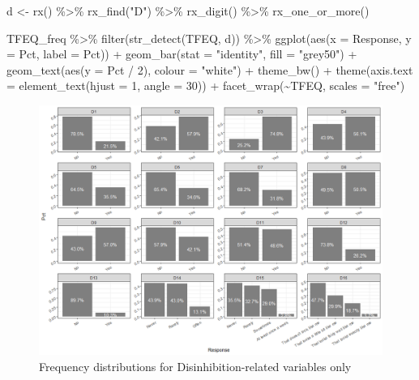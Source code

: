 \documentclass[
]{krantz}
\makeatletter
\newenvironment{Shaded}{\begin{snugshade}}{\end{snugshade}}
\newcommand{\AttributeTok}[1]{\textcolor[rgb]{0.61,0.61,0.61}{#1}}
\newcommand{\DecValTok}[1]{\textcolor[rgb]{0.06,0.06,0.06}{#1}}
\newcommand{\FunctionTok}[1]{\textcolor[rgb]{0,0,0}{#1}}
\newcommand{\NormalTok}[1]{#1}
\newcommand{\OtherTok}[1]{\textcolor[rgb]{0.37,0.37,0.37}{#1}}
\newcommand{\SpecialCharTok}[1]{\textcolor[rgb]{0,0,0}{#1}}
\newcommand{\StringTok}[1]{\textcolor[rgb]{0.5,0.5,0.5}{#1}}
\newenvironment{kframe}{%
\medskip{}
\setlength{\fboxsep}{.8em}
 \def\at@end@of@kframe{}%
 \ifinner\ifhmode%
  \def\at@end@of@kframe{\end{minipage}}%
  \begin{minipage}{\columnwidth}%
 \fi\fi%
 \def\FrameCommand##1{\hskip\@totalleftmargin \hskip-\fboxsep
 \colorbox{shadecolor}{##1}\hskip-\fboxsep
     \hskip-\linewidth \hskip-\@totalleftmargin \hskip\columnwidth}%
 \MakeFramed {\advance\hsize-\width
   \@totalleftmargin\z@ \linewidth\hsize
   \@setminipage}}%
 {\par\unskip\endMakeFramed%
 \at@end@of@kframe}
\renewenvironment{Shaded}{\begin{kframe}}{\end{kframe}}
\makeatother
\begin{document}
\begin{Shaded}
\begin{Highlighting}[]
\NormalTok{d }\OtherTok{\textless{}{-}} \FunctionTok{rx}\NormalTok{() }\SpecialCharTok{\%\textgreater{}\%}
  \FunctionTok{rx\_find}\NormalTok{(}\StringTok{"D"}\NormalTok{) }\SpecialCharTok{\%\textgreater{}\%}
  \FunctionTok{rx\_digit}\NormalTok{() }\SpecialCharTok{\%\textgreater{}\%}
  \FunctionTok{rx\_one\_or\_more}\NormalTok{()}

\NormalTok{TFEQ\_freq }\SpecialCharTok{\%\textgreater{}\%}
  \FunctionTok{filter}\NormalTok{(}\FunctionTok{str\_detect}\NormalTok{(TFEQ, d)) }\SpecialCharTok{\%\textgreater{}\%}
  \FunctionTok{ggplot}\NormalTok{(}\FunctionTok{aes}\NormalTok{(}\AttributeTok{x =}\NormalTok{ Response, }\AttributeTok{y =}\NormalTok{ Pct, }\AttributeTok{label =}\NormalTok{ Pct)) }\SpecialCharTok{+}
  \FunctionTok{geom\_bar}\NormalTok{(}\AttributeTok{stat =} \StringTok{"identity"}\NormalTok{, }\AttributeTok{fill =} \StringTok{"grey50"}\NormalTok{) }\SpecialCharTok{+}
  \FunctionTok{geom\_text}\NormalTok{(}\FunctionTok{aes}\NormalTok{(}\AttributeTok{y =}\NormalTok{ Pct }\SpecialCharTok{/} \DecValTok{2}\NormalTok{), }\AttributeTok{colour =} \StringTok{"white"}\NormalTok{) }\SpecialCharTok{+}
  \FunctionTok{theme\_bw}\NormalTok{() }\SpecialCharTok{+}
  \FunctionTok{theme}\NormalTok{(}\AttributeTok{axis.text =} \FunctionTok{element\_text}\NormalTok{(}\AttributeTok{hjust =} \DecValTok{1}\NormalTok{, }\AttributeTok{angle =} \DecValTok{30}\NormalTok{)) }\SpecialCharTok{+}
  \FunctionTok{facet\_wrap}\NormalTok{(}\SpecialCharTok{\textasciitilde{}}\NormalTok{TFEQ, }\AttributeTok{scales =} \StringTok{"free"}\NormalTok{)}
\end{Highlighting}
\end{Shaded}

\begin{figure}
\includegraphics[width=14.76in]{images/TFEQ_barplots_facet} \caption{Frequency distributions for Disinhibition-related variables only}\label{fig:unnamed-chunk-276}
\end{figure}
\end{document}
